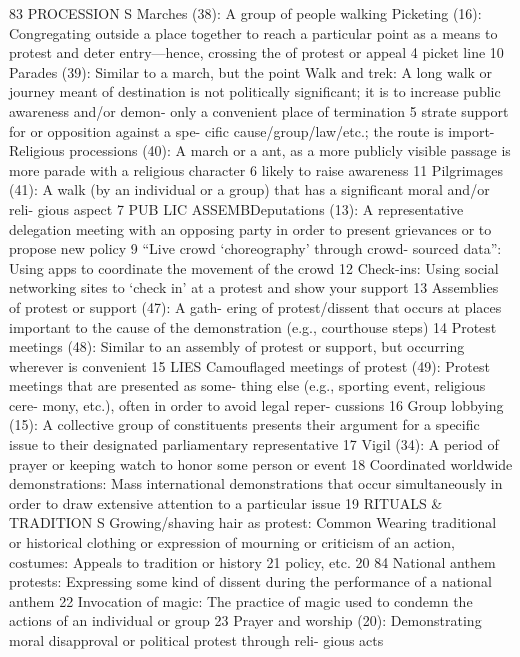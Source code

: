 \documentclass[twoside,a4paper,12pt,fleqn,openany]{extbook}
\begin{document}
83
PROCESSION S
Marches (38): A group of people walking
 Picketing (16): Congregating outside a place
together to reach a particular point as a means
 to protest and deter entry—hence, crossing the
of protest or appeal
 4
 picket line
 10
Parades (39): Similar to a march, but the point
 Walk and trek: A long walk or journey meant
of destination is not politically significant; it is
 to increase public awareness and/or demon-
only a convenient place of termination
 5
 strate support for or opposition against a spe-
cific cause/group/law/etc.; the route is import-
Religious processions (40): A march or a
 ant, as a more publicly visible passage is more
parade with a religious character
 6
 likely to raise awareness
 11
Pilgrimages (41): A walk (by an individual or a
group) that has a significant moral and/or reli-
gious aspect
 7
PUB LIC ASSEMBDeputations (13): A representative delegation
meeting with an opposing party in order to
present grievances or to propose new policy		
9
“Live crowd ‘choreography’ through crowd-
sourced data”: Using apps to coordinate the
movement of the crowd
 12
Check-ins: Using social networking sites to
‘check in’ at a protest and show your support
13
Assemblies of protest or support (47): A gath-
ering of protest/dissent that occurs at places
important to the cause of the demonstration
(e.g., courthouse steps)
 14
Protest meetings (48): Similar to an assembly
of protest or support, but occurring wherever
is convenient
 15
LIES
Camouflaged meetings of protest (49):
Protest meetings that are presented as some-
thing else (e.g., sporting event, religious cere-
mony, etc.), often in order to avoid legal reper-
cussions
 16
Group lobbying (15): A collective group of
constituents presents their argument for a
specific issue to their designated parliamentary
representative
 17
Vigil (34): A period of prayer or keeping watch
to honor some person or event
 18
Coordinated worldwide demonstrations:
Mass international demonstrations that occur
simultaneously in order to draw extensive
attention to a particular issue
 19
RITUALS & TRADITION S
Growing/shaving hair as protest: Common
 Wearing traditional or historical clothing or
expression of mourning or criticism of an action,
 costumes: Appeals to tradition or history 21
policy, etc.
 20
84
National anthem protests: Expressing some
kind of dissent during the performance of a
national anthem
 22
Invocation of magic: The practice of magic
used to condemn the actions of an individual
or group
 23
Prayer and worship (20): Demonstrating moral
disapproval or political protest through reli-
gious acts
\end{document}
